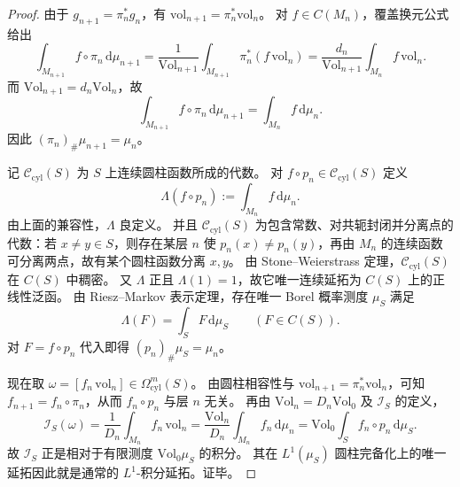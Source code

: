\begin{proof}
由于 \(g_{n+1}=\pi_n^\ast g_n\)，有 \(\mathrm{vol}_{n+1}=\pi_n^\ast\mathrm{vol}_n\)。
对 \(f\in C(M_n)\)，覆盖换元公式给出
\[
\int_{M_{n+1}} f\circ \pi_n\,\mathrm d\mu_{n+1}
=
\frac1{\mathrm{Vol}_{n+1}}\int_{M_{n+1}}\pi_n^\ast(f\,\mathrm{vol}_n)
=
\frac{d_n}{\mathrm{Vol}_{n+1}}\int_{M_n}f\,\mathrm{vol}_n.
\]
而 \(\mathrm{Vol}_{n+1}=d_n\mathrm{Vol}_n\)，故
\[
\int_{M_{n+1}} f\circ \pi_n\,\mathrm d\mu_{n+1}
=
\int_{M_n}f\,\mathrm d\mu_n.
\]
因此 \((\pi_n)_\#\mu_{n+1}=\mu_n\)。

记 \(\mathscr C_{\mathrm{cyl}}(S)\) 为 \(S\) 上连续圆柱函数所成的代数。
对 \(f\circ p_n\in\mathscr C_{\mathrm{cyl}}(S)\) 定义
\[
\Lambda(f\circ p_n):=\int_{M_n}f\,\mathrm d\mu_n.
\]
由上面的兼容性，\(\Lambda\) 良定义。
并且 \(\mathscr C_{\mathrm{cyl}}(S)\) 为包含常数、对共轭封闭并分离点的代数：若 \(x\neq y\in S\)，则存在某层 \(n\) 使 \(p_n(x)\neq p_n(y)\)，再由 \(M_n\) 的连续函数可分离两点，故有某个圆柱函数分离 \(x,y\)。
由 Stone--Weierstrass 定理，\(\mathscr C_{\mathrm{cyl}}(S)\) 在 \(C(S)\) 中稠密。
又 \(\Lambda\) 正且 \(\Lambda(1)=1\)，故它唯一连续延拓为 \(C(S)\) 上的正线性泛函。
由 Riesz--Markov 表示定理，存在唯一 Borel 概率测度 \(\mu_S\) 满足
\[
\Lambda(F)=\int_S F\,\mathrm d\mu_S
\qquad(F\in C(S)).
\]
对 \(F=f\circ p_n\) 代入即得 \((p_n)_\#\mu_S=\mu_n\)。

现在取 \(\omega=[f_n\,\mathrm{vol}_n]\in\Omega_{\mathrm{cyl}}^m(S)\)。
由圆柱相容性与 \(\mathrm{vol}_{n+1}=\pi_n^\ast\mathrm{vol}_n\)，可知 \(f_{n+1}=f_n\circ \pi_n\)，从而 \(f_n\circ p_n\) 与层 \(n\) 无关。
再由 \(\mathrm{Vol}_n=D_n\mathrm{Vol}_0\) 及 \(\mathcal I_S\) 的定义，
\[
\mathcal I_S(\omega)
=
\frac1{D_n}\int_{M_n}f_n\,\mathrm{vol}_n
=
\frac{\mathrm{Vol}_n}{D_n}\int_{M_n}f_n\,\mathrm d\mu_n
=
\mathrm{Vol}_0\int_S f_n\circ p_n\,\mathrm d\mu_S.
\]
故 \(\mathcal I_S\) 正是相对于有限测度 \(\mathrm{Vol}_0\mu_S\) 的积分。
其在 \(L^1(\mu_S)\) 圆柱完备化上的唯一延拓因此就是通常的 \(L^1\)-积分延拓。证毕。
\end{proof}

